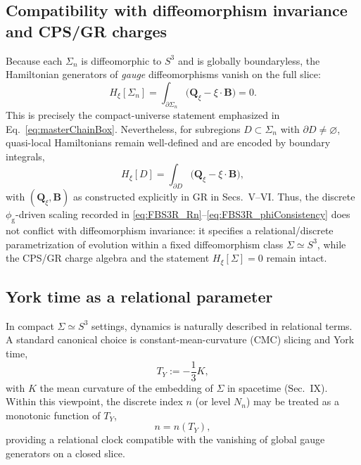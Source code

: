 \documentclass[
  reprint,
  amsmath,amssymb,
  aps,
  prd,
  superscriptaddress,
  nofootinbib,
  longbibliography
]{revtex4-2}
\newcommand{\goldconst}{\ensuremath{\phi_{\!\mathrm{g}}}} %
\newcommand{\Q}{\bm{Q}}
\newcommand{\Bnd}{\bm{B}}
\begin{document}
\subsection{Compatibility with diffeomorphism invariance and CPS/GR charges}
\label{subsec:FBS3R_CPS_compat}
Because each $\Sigma_n$ is diffeomorphic to $S^3$ and is globally boundaryless, the Hamiltonian generators of
\emph{gauge} diffeomorphisms vanish on the full slice:
\begin{equation}
H_\xi[\Sigma_n]=\int_{\partial\Sigma_n}\bigl(\Q_\xi-\xi\cdot\Bnd\bigr)=0.
\end{equation}
This is precisely the compact-universe statement emphasized in Eq.~\eqref{eq:masterChainBox}.
Nevertheless, for subregions $D\subset\Sigma_n$ with $\partial D\neq\varnothing$, quasi-local Hamiltonians remain
well-defined and are encoded by boundary integrals,
\begin{equation}
H_\xi[D]=\int_{\partial D}\bigl(\Q_\xi-\xi\cdot\Bnd\bigr),
\end{equation}
with $(\Q_\xi,\Bnd)$ as constructed explicitly in GR in Secs.~V--VI.
Thus, the discrete $\goldconst$-driven scaling recorded in \eqref{eq:FBS3R_Rn}--\eqref{eq:FBS3R_phiConsistency}
does not conflict with diffeomorphism invariance: it specifies a relational/discrete parametrization of evolution
within a fixed diffeomorphism class $\Sigma\simeq S^3$, while the CPS/GR charge algebra and the statement
$H_\xi[\Sigma]=0$ remain intact.
\subsection{York time as a relational parameter}
\label{subsec:FBS3R_york}
In compact $\Sigma\simeq S^3$ settings, dynamics is naturally described in relational terms.
A standard canonical choice is constant-mean-curvature (CMC) slicing and York time,
\begin{equation}
T_Y := -\frac{1}{3}K,
\end{equation}
with $K$ the mean curvature of the embedding of $\Sigma$ in spacetime (Sec.~IX).
Within this viewpoint, the discrete index $n$ (or level $N_n$) may be treated as a monotonic function of $T_Y$,
\begin{equation}
n=n(T_Y),
\end{equation}
providing a relational clock compatible with the vanishing of global gauge generators on a closed slice.
\end{document}

